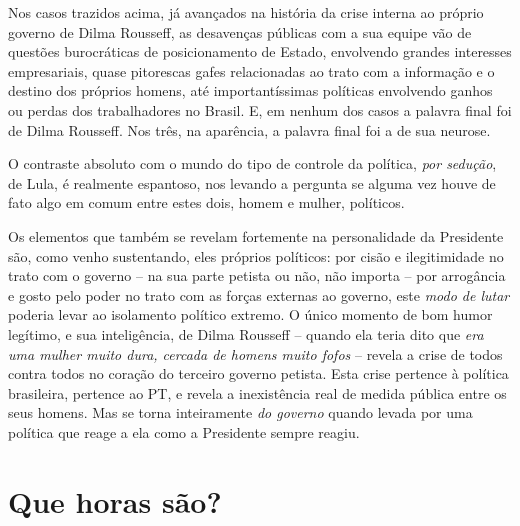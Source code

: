 Nos casos trazidos acima, já avançados na história da crise interna ao
próprio governo de Dilma Rousseff, as desavenças públicas com a sua
equipe vão de questões burocráticas de posicionamento de Estado,
envolvendo grandes interesses empresariais, quase pitorescas gafes
relacionadas ao trato com a informação e o destino dos próprios homens,
até importantíssimas políticas envolvendo ganhos ou perdas dos
trabalhadores no Brasil. E, em nenhum dos casos a palavra final foi de
Dilma Rousseff. Nos três, na aparência, a palavra final foi a de sua
neurose.

O contraste absoluto com o mundo do tipo de controle da política,
\emph{por sedução}, de Lula, é realmente espantoso, nos levando a
pergunta se alguma vez houve de fato algo em comum entre estes dois,
homem e mulher, políticos.

Os elementos que também se revelam fortemente na personalidade da
Presidente são, como venho sustentando, eles próprios políticos: por
cisão e ilegitimidade no trato com o governo -- na sua parte petista ou
não, não importa -- por arrogância e gosto pelo poder no trato com as
forças externas ao governo, este \emph{modo de lutar} poderia levar ao
isolamento político extremo. O único momento de bom humor legítimo, e
sua inteligência, de Dilma Rousseff -- quando ela teria dito que
\emph{era uma mulher muito dura, cercada de homens muito fofos} --
revela a crise de todos contra todos no coração do terceiro governo
petista. Esta crise pertence à política brasileira, pertence ao PT, e
revela a inexistência real de medida pública entre os seus homens. Mas
se torna inteiramente \emph{do governo} quando levada por uma política
que reage a ela como a Presidente sempre reagiu.

\chapter{Que horas são?}\label{que-horas-suxe3o}

